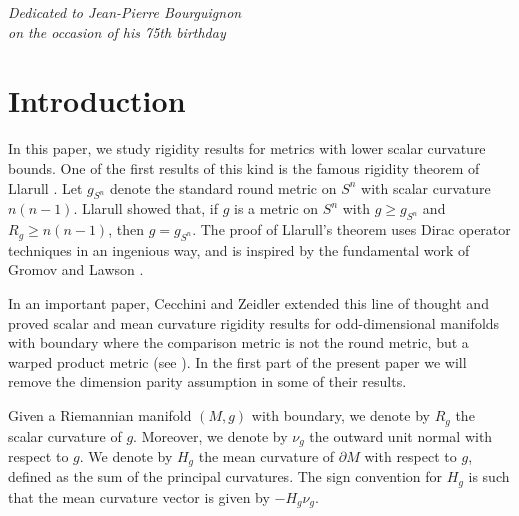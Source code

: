 \documentclass[pdftex]{sigma}
\numberwithin{equation}{section}
\begin{document}


\begin{flushright}
\begin{minipage}{65mm}
\it
Dedicated to Jean-Pierre Bourguignon\\
 on the occasion of his 75th birthday
 \end{minipage}
\end{flushright}

\renewcommand{\thefootnote}{\arabic{footnote}}
\setcounter{footnote}{0}

\section{Introduction}

In this paper, we study rigidity results for metrics with lower scalar curvature bounds.
One of the first results of this kind is the famous rigidity theorem of Llarull \cite{Llarull}.
Let $g_{S^n}$ denote the standard round metric on $S^n$ with scalar curvature $n(n-1)$. Llarull showed that, if $g$ is a metric on $S^n$ with $g \geq g_{S^n}$ and $R_g \geq n(n-1)$, then $g=g_{S^n}$.
The proof of Llarull's theorem uses Dirac operator techniques in an ingenious way, and is inspired by the fundamental work of Gromov and Lawson \cite{Gromov-Lawson1, Gromov-Lawson2}.

In an important paper, Cecchini and Zeidler extended this line of thought and proved scalar and mean curvature rigidity results for odd-dimensional manifolds with boundary where the comparison metric is not the round metric, but a warped product metric (see \cite[Section~10]{Cecchini-Zeidler}).
In the first part of the present paper we will remove the dimension parity assumption in some of their results.

Given a Riemannian manifold $(M,g)$ with boundary, we denote by $R_g$ the scalar curvature of $g$. Moreover, we denote by $\nu_g$ the outward unit normal with respect to $g$.
We denote by $H_g$ the mean curvature of $\partial M$ with respect to $g$, defined as the sum of the principal curvatures.
The sign convention for $H_g$ is such that the mean curvature vector is given by $-H_g\nu_g$.
\end{document}
